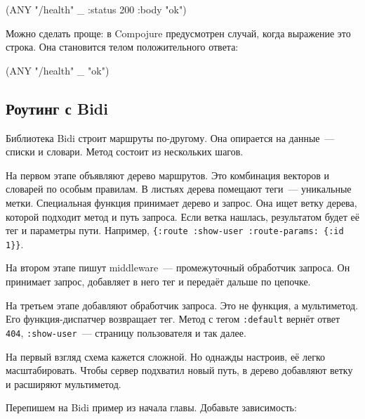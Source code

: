 
\begin{english}
  \begin{clojure}
(ANY "/health" _ {:status 200 :body "ok"})
  \end{clojure}
\end{english}

Можно сделать проще: в Compojure предусмотрен случай, когда выражение это
строка. Она становится телом положительного ответа:

\begin{english}
  \begin{clojure}
(ANY "/health" _ "ok")
  \end{clojure}
\end{english}

\subsection{Роутинг с Bidi}


Библиотека Bidi строит маршруты
по-другому. Она опирается на данные~--- списки и словари. Метод состоит из
нескольких шагов.

На первом этапе объявляют дерево маршрутов. Это комбинация векторов и словарей
по особым правилам. В листьях дерева помещают теги~--- уникальные
метки. Специальная функция принимает дерево и запрос. Она ищет ветку дерева,
которой подходит метод и путь запроса. Если ветка нашлась, результатом будет
её тег и параметры пути. Например, \verb|{:route :show-user :route-params: {:id 1}}|.


На втором этапе пишут middleware~--- промежуточный обработчик запроса. Он
принимает запрос, добавляет в него тег и передаёт дальше по цепочке.

На третьем этапе добавляют обработчик запроса. Это не функция, а мультиметод.
Его функция-диспатчер возвращает тег. Метод с тегом \verb|:default| вернёт
ответ \verb|404|, \verb|:show-user|~--- страницу пользователя и так далее.

На первый взгляд схема кажется сложной. Но однажды настроив, её легко
масштабировать. Чтобы сервер подхватил новый путь, в дерево добавляют ветку и
расширяют мультиметод.


Перепишем на Bidi пример из начала главы. Добавьте зависимость:


